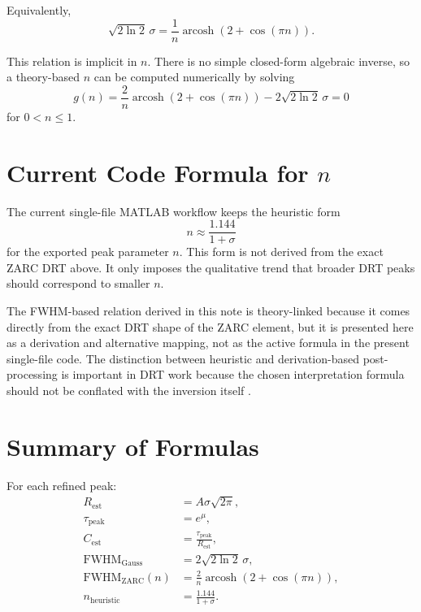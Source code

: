 \documentclass[11pt]{article}
\begin{document}
Equivalently,
\begin{equation}
\sqrt{2\ln 2}\,\sigma = \frac{1}{n} \operatorname{arcosh}\left(2 + \cos(\pi n)\right).
\end{equation}

This relation is implicit in $n$. There is no simple closed-form algebraic inverse, so a theory-based $n$ can be computed numerically by solving
\begin{equation}
g(n) = \frac{2}{n} \operatorname{arcosh}\left(2 + \cos(\pi n)\right) - 2\sqrt{2\ln 2}\,\sigma = 0
\end{equation}
for $0 < n \le 1$.

\section{Current Code Formula for $n$}

The current single-file MATLAB workflow keeps the heuristic form
\begin{equation}
n \approx \frac{1.144}{1 + \sigma}
\end{equation}
for the exported peak parameter $n$. This form is not derived from the exact ZARC DRT above. It only imposes the qualitative trend that broader DRT peaks should correspond to smaller $n$.

The FWHM-based relation derived in this note is theory-linked because it comes directly from the exact DRT shape of the ZARC element, but it is presented here as a derivation and alternative mapping, not as the active formula in the present single-file code. The distinction between heuristic and derivation-based post-processing is important in DRT work because the chosen interpretation formula should not be conflated with the inversion itself \cite{cordoba2018,danzer2019,maradesa2023}.

\section{Summary of Formulas}

For each refined peak:
\begin{align}
R_{\mathrm{est}} &= A\sigma\sqrt{2\pi}, \\
\tau_{\mathrm{peak}} &= e^{\mu}, \\
C_{\mathrm{est}} &= \frac{\tau_{\mathrm{peak}}}{R_{\mathrm{est}}}, \\
\mathrm{FWHM}_{\mathrm{Gauss}} &= 2\sqrt{2\ln 2}\,\sigma, \\
\mathrm{FWHM}_{\mathrm{ZARC}}(n) &= \frac{2}{n} \operatorname{arcosh}\left(2 + \cos(\pi n)\right), \\
n_{\mathrm{heuristic}} &= \frac{1.144}{1 + \sigma}.
\end{align}
\end{document}
